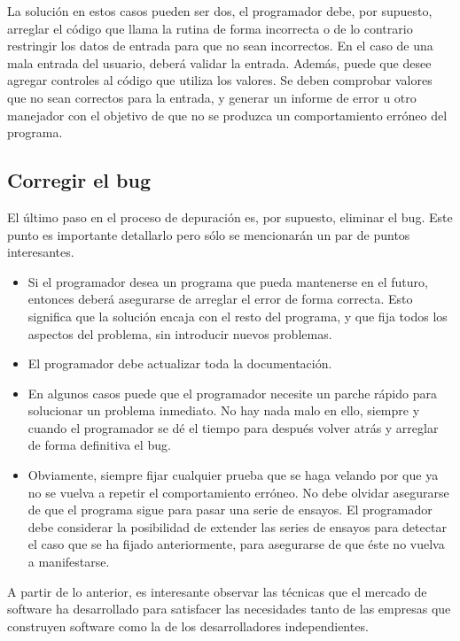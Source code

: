 \documentclass[12pt,legalpaper]{report}
\begin{document}
La solución en estos casos pueden ser dos, el programador debe, por supuesto, arreglar el código que llama la rutina de forma incorrecta o de lo contrario restringir los datos de entrada para que no sean incorrectos. En el caso de una mala entrada del usuario, deberá validar la entrada. Además, puede que desee agregar controles al código que utiliza los valores.  Se deben comprobar valores que no sean correctos para la entrada, y generar un informe de error u otro manejador con el objetivo de que no se produzca un comportamiento erróneo del programa.


\subsection{Corregir el bug}

El último paso en el proceso de depuración es, por supuesto, eliminar el bug. Este punto es importante detallarlo pero sólo se mencionarán un par de puntos interesantes.

\begin{itemize}
    \item Si el programador desea un programa que pueda mantenerse en el futuro, entonces deberá asegurarse de arreglar el error de forma correcta. Esto significa que la solución encaja con el resto del programa, y que fija todos los aspectos del problema, sin introducir nuevos problemas. 

    \item El programador debe actualizar toda la documentación. 

    \item En algunos casos puede que el programador necesite un parche rápido para solucionar un problema inmediato. No hay nada malo en ello, siempre y cuando el programador se dé el tiempo para después volver atrás y arreglar de forma definitiva el bug. 

    \item Obviamente, siempre fijar cualquier prueba que se haga velando por que ya no se vuelva a repetir el comportamiento erróneo. No debe olvidar asegurarse de que el programa sigue para pasar una serie de ensayos. El programador debe considerar la posibilidad de extender las series de ensayos para detectar el caso que se ha fijado anteriormente, para asegurarse de que éste no vuelva a manifestarse.
\end{itemize}

A partir de lo anterior, es interesante observar las técnicas que el mercado de software ha desarrollado para satisfacer las necesidades tanto de las empresas que construyen software como la de los desarrolladores independientes.
\end{document}
